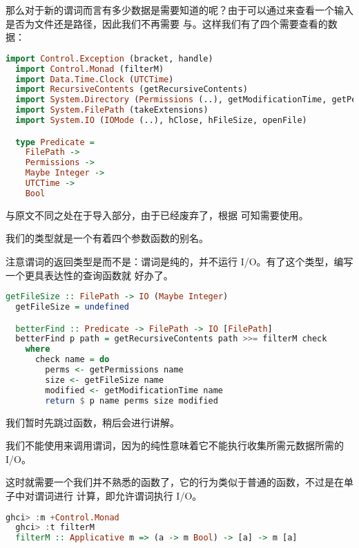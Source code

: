\documentclass[./main.tex]{subfiles}
\begin{document}
那么对于新的谓词而言有多少数据是需要知道的呢？由于可以通过来查看一个输入是否为文件还是路径，因此我们不再需要
与。这样我们有了四个需要查看的数据：

\begin{lstlisting}[language=Haskell]
  import Control.Exception (bracket, handle)
  import Control.Monad (filterM)
  import Data.Time.Clock (UTCTime)
  import RecursiveContents (getRecursiveContents)
  import System.Directory (Permissions (..), getModificationTime, getPermissions)
  import System.FilePath (takeExtensions)
  import System.IO (IOMode (..), hClose, hFileSize, openFile)

  type Predicate =
    FilePath ->
    Permissions ->
    Maybe Integer ->
    UTCTime ->
    Bool
\end{lstlisting}

与原文不同之处在于导入部分，由于已经废弃了，根据
可知需要使用。

我们的类型就是一个有着四个参数函数的别名。

注意谓词的返回类型是而不是：谓词是纯的，并不运行 I/O。有了这个类型，编写一个更具表达性的查询函数就
好办了。

\begin{lstlisting}[language=Haskell]
  getFileSize :: FilePath -> IO (Maybe Integer)
  getFileSize = undefined

  betterFind :: Predicate -> FilePath -> IO [FilePath]
  betterFind p path = getRecursiveContents path >>= filterM check
    where
      check name = do
        perms <- getPermissions name
        size <- getFileSize name
        modified <- getModificationTime name
        return $ p name perms size modified
\end{lstlisting}

我们暂时先跳过函数，稍后会进行讲解。

我们不能使用来调用谓词，因为的纯性意味着它不能执行收集所需元数据所需的 I/O。

这时就需要一个我们并不熟悉的函数了，它的行为类似于普通的函数，不过是在单子中对谓词进行
计算，即允许谓词执行 I/O。

\begin{lstlisting}[language=Haskell]
  ghci> :m +Control.Monad
  ghci> :t filterM
  filterM :: Applicative m => (a -> m Bool) -> [a] -> m [a]
\end{lstlisting}
\end{document}
